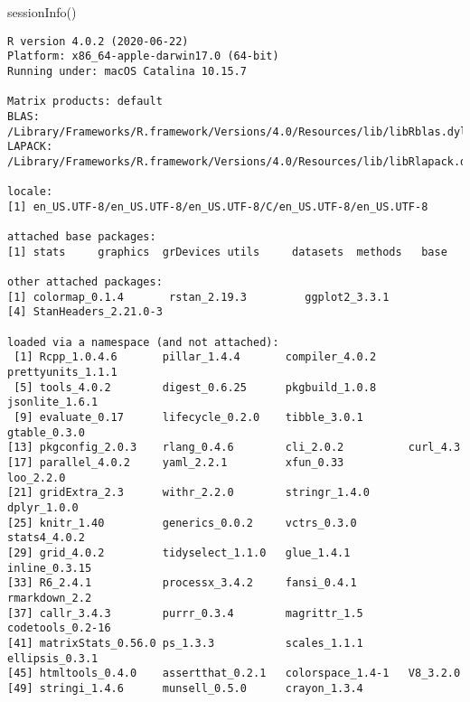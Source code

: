 \documentclass[
  letterpaper,
  DIV=11,
  numbers=noendperiod]{scrartcl}
\newenvironment{Shaded}{\begin{snugshade}}{\end{snugshade}}
\newcommand{\FunctionTok}[1]{\textcolor[rgb]{0.28,0.35,0.67}{#1}}
\newcommand{\NormalTok}[1]{\textcolor[rgb]{0.00,0.23,0.31}{#1}}
\begin{document}
\begin{Shaded}
\begin{Highlighting}[]
\FunctionTok{sessionInfo}\NormalTok{()}
\end{Highlighting}
\end{Shaded}

\begin{verbatim}
R version 4.0.2 (2020-06-22)
Platform: x86_64-apple-darwin17.0 (64-bit)
Running under: macOS Catalina 10.15.7

Matrix products: default
BLAS:   /Library/Frameworks/R.framework/Versions/4.0/Resources/lib/libRblas.dylib
LAPACK: /Library/Frameworks/R.framework/Versions/4.0/Resources/lib/libRlapack.dylib

locale:
[1] en_US.UTF-8/en_US.UTF-8/en_US.UTF-8/C/en_US.UTF-8/en_US.UTF-8

attached base packages:
[1] stats     graphics  grDevices utils     datasets  methods   base     

other attached packages:
[1] colormap_0.1.4       rstan_2.19.3         ggplot2_3.3.1       
[4] StanHeaders_2.21.0-3

loaded via a namespace (and not attached):
 [1] Rcpp_1.0.4.6       pillar_1.4.4       compiler_4.0.2     prettyunits_1.1.1 
 [5] tools_4.0.2        digest_0.6.25      pkgbuild_1.0.8     jsonlite_1.6.1    
 [9] evaluate_0.17      lifecycle_0.2.0    tibble_3.0.1       gtable_0.3.0      
[13] pkgconfig_2.0.3    rlang_0.4.6        cli_2.0.2          curl_4.3          
[17] parallel_4.0.2     yaml_2.2.1         xfun_0.33          loo_2.2.0         
[21] gridExtra_2.3      withr_2.2.0        stringr_1.4.0      dplyr_1.0.0       
[25] knitr_1.40         generics_0.0.2     vctrs_0.3.0        stats4_4.0.2      
[29] grid_4.0.2         tidyselect_1.1.0   glue_1.4.1         inline_0.3.15     
[33] R6_2.4.1           processx_3.4.2     fansi_0.4.1        rmarkdown_2.2     
[37] callr_3.4.3        purrr_0.3.4        magrittr_1.5       codetools_0.2-16  
[41] matrixStats_0.56.0 ps_1.3.3           scales_1.1.1       ellipsis_0.3.1    
[45] htmltools_0.4.0    assertthat_0.2.1   colorspace_1.4-1   V8_3.2.0          
[49] stringi_1.4.6      munsell_0.5.0      crayon_1.3.4      
\end{verbatim}
\end{document}
